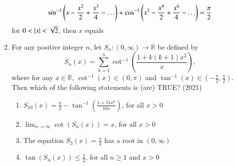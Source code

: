 \begin{enumerate}[label=\thesubsection.\arabic*,ref=\thesubsection.\theenumi]
\begin{align*}
\sin ^{-1}\left(x-\frac{x^2}{2}+\frac{x^3}{4}-\ldots\right)+ \cos ^{-1}\left(x^2-\frac{x^4}{2}+\frac{x^6}{4}-\ldots\right)=\frac{\pi}{2}
\end{align*}
for $0<\left\vert x\right\vert<\sqrt{2}$, then $x$ equals 
\hfill {}
\begin{enumerate}
\end{enumerate}
    \item For any positive integer $n$, let $S_n: (0, \infty) \to \mathbb{R}$ be defined by  
    \[
    S_n(x) = \sum_{k=1}^n \cot^{-1}\left(\frac{1 + k(k+1)x^2}{x}\right),
    \]  
    where for any $x \in \mathbb{R}$, $\cot^{-1}(x) \in (0, \pi)$ and $\tan^{-1}(x) \in \left(-\frac{\pi}{2}, \frac{\pi}{2}\right)$. Then which of the following statements is (are) TRUE?  
    \hfill (2021)
\begin{enumerate}
         \item  $S_{10}(x) = \frac{\pi}{2} - \tan^{-1}\left(\frac{1 + 11x^2}{10x}\right)$, for all $x > 0$  
         \item  $\lim_{n \to \infty} \cot(S_n(x)) = x$, for all $x > 0$  
         \item  The equation $S_3(x) = \frac{\pi}{4}$ has a root in $(0, \infty)$  
         \item  $\tan(S_n(x)) \leq \frac{1}{2}$, for all $n \geq 1$ and $x > 0$
    \end{enumerate}
\end{enumerate}
